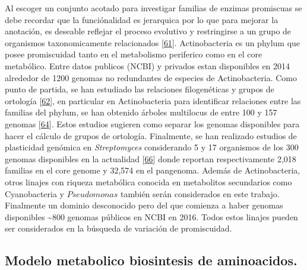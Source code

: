 \documentclass[12pt,twoside]{reedthesis}
\begin{document}
  Al escoger un conjunto acotado para investigar familias de enzimas
  promiscuas se debe recordar que la funciónalidad es jerarquica por lo
  que para mejorar la anotación, es deseable reflejar el proceso evolutivo
  y restringirse a un grupo de organismos taxonomicamente relacionados
  {[}\protect\hyperlink{ref-cruz-morales_phylogenomic_2016}{61}{]}.
  Actinobacteria es un phylum que posee promiscuidad tanto en el
  metabolismo periferico como en el core metabólico. Entre datos publicos
  (NCBI) y privados estan disponibles en 2014 alrededor de 1200 genomas no
  redundantes de especies de Actinobacteria. Como punto de partida, se han
  estudiado las relaciones filogenéticas y grupos de ortología
  {[}\protect\hyperlink{ref-li_orthomcl_2003}{62}{]}, en particular en
  Actinobacteria para identificar relaciones entre las familias del
  phylum, se han obtenido árboles multilocus de entre 100 y 157 genomas
  {[}\protect\hyperlink{ref-gao_phylogenetic_2012}{64}{]}. Estos estudios
  sugieren como separar los genomas disponibles para hacer el cálculo de
  grupos de ortología. Finalmente, se han realizado estudios de
  plasticidad genómica en \emph{Streptomyces} considerando 5 y 17
  organismos de los 300 genomas disponibles en la actualidad
  {[}\protect\hyperlink{ref-zhou_genome_2012}{66}{]} donde reportan
  respectivamente 2,018 familias en el core genome y 32,574 en el
  pangenoma. Además de Actinobacteria, otros linajes con riqueza
  metabólica conocida en metabolitos secundarios como Cyanobacteria y
  \(Pseudomonas\) también serán considerados en este trabajo. Finalmente
  un dominio desconocido pero del que comienza a haber genomas disponibles
  \textasciitilde{}800 genomas públicos en NCBI en 2016. Todos estos
  linajes pueden ser considerados en la búsqueda de variación de
  promiscuidad.
  
  \subsection{Modelo metabolico biosintesis de
  aminoacidos.}\label{modelo-metabolico-biosintesis-de-aminoacidos.}
  
\end{document}
